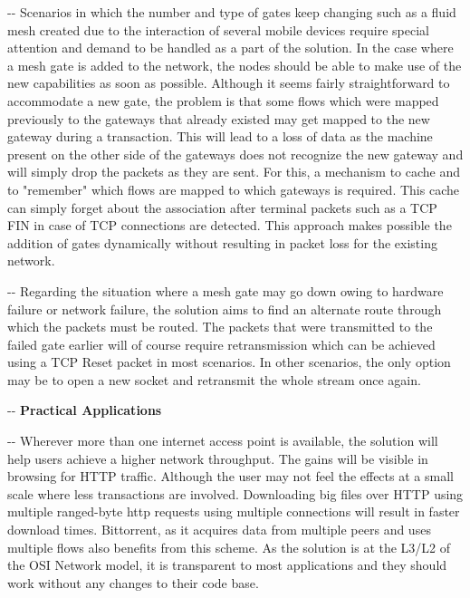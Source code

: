 \documentclass[12pt]{article}
\makeatletter
\newenvironment{indentation}[3]%
	{\par\setlength{\parindent}{#3}
	\setlength{\leftmargin}{#1}       \setlength{\rightmargin}{#1}%
	\advance\linewidth -\leftmargin       \advance\linewidth -\rightmargin%
	\advance\@totalleftmargin\leftmargin  \@setpar{{\@@par}}%
	\parshape 1\@totalleftmargin \linewidth\ignorespaces}{\par}%
\makeatother
\begin{document}
\begin{indentation}{0pt}{0pt}{0pt}
{\normalsize \hspace{1cm} Scenarios in which the number and type of gates keep changing such as a fluid mesh created due to the interaction of several mobile devices require special attention and demand to be handled as a part of the solution. In the case where a mesh gate is added to the network, the nodes should be able to make use of the new capabilities as soon as possible. Although it seems fairly straightforward to accommodate a new gate, the problem is that some flows which were mapped previously to the gateways that already existed may get mapped to the new gateway during a transaction. This will lead to a loss of data as the machine present on the other side of the gateways does not recognize the new gateway and will simply drop the packets as they are sent. For this, a mechanism to cache and to "remember" which flows are mapped to which gateways is required. This cache can simply forget about the association after terminal packets such as a TCP FIN in case of TCP connections are detected. This approach makes possible the addition of gates dynamically without resulting in packet loss for the existing network.}
\end{indentation}

\begin{indentation}{0pt}{0pt}{0pt}
{\normalsize \hspace{1cm} Regarding the situation where a mesh gate may go down owing to hardware failure or network failure, the solution aims to find an alternate route through which the packets must be routed. The packets that were transmitted to the failed gate earlier will of course require retransmission which can be achieved using a TCP Reset packet in most scenarios. In other scenarios, the only option may be to open a new socket and retransmit the whole stream once again.}
\end{indentation}


\begin{indentation}{0pt}{0pt}{0pt}
\vspace{1cm}
\textbf{{{\Large Practical Applications}}}
\end{indentation}
\vspace{0.5cm}

\begin{indentation}{0pt}{0pt}{0pt}
{\normalsize \hspace{1cm} Wherever more than one internet access point is available, the solution will help users achieve a higher network throughput. The gains will be visible in browsing for HTTP traffic. Although the user may not feel the effects at a small scale where less transactions are involved. Downloading big files over HTTP using multiple ranged-byte http requests using multiple connections will result in faster download times. Bittorrent, as it acquires data from multiple peers and uses multiple flows also benefits from this scheme. As the solution is at the L3/L2 of the OSI Network model, it is transparent to most applications and they should work without any changes to their code base.}
\end{indentation}
\end{document}
